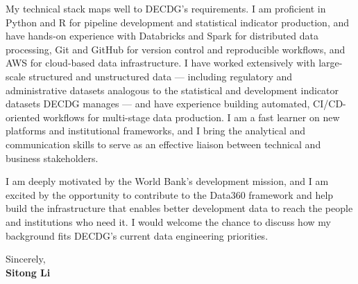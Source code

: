 \documentclass[12pt]{article}
\begin{document}
My technical stack maps well to DECDG's requirements. I am proficient in Python and R for pipeline development and statistical indicator production, and have hands-on experience with Databricks and Spark for distributed data processing, Git and GitHub for version control and reproducible workflows, and AWS for cloud-based data infrastructure. I have worked extensively with large-scale structured and unstructured data --- including regulatory and administrative datasets analogous to the statistical and development indicator datasets DECDG manages --- and have experience building automated, CI/CD-oriented workflows for multi-stage data production. I am a fast learner on new platforms and institutional frameworks, and I bring the analytical and communication skills to serve as an effective liaison between technical and business stakeholders.

I am deeply motivated by the World Bank's development mission, and I am excited by the opportunity to contribute to the Data360 framework and help build the infrastructure that enables better development data to reach the people and institutions who need it. I would welcome the chance to discuss how my background fits DECDG's current data engineering priorities.

\vspace{1em}

\noindent Sincerely,\\[0.5em]
\textbf{Sitong Li}
\end{document}
